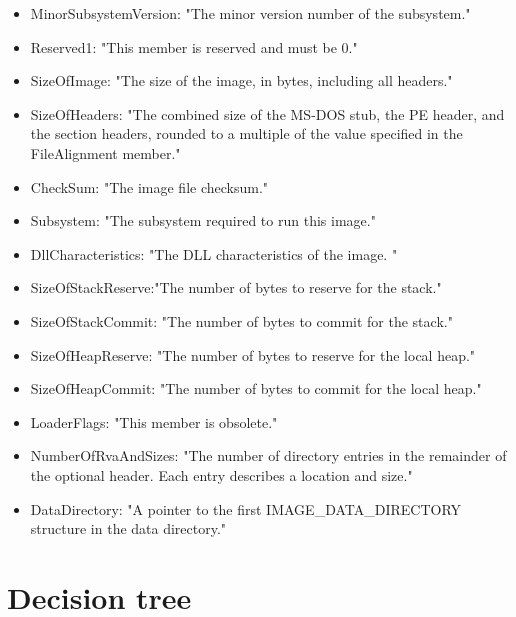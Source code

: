 \begin{itemize}
\item MinorSubsystemVersion: "The minor version number of the subsystem."
\item Reserved1: "This member is reserved and must be 0."
\item SizeOfImage: "The size of the image, in bytes, including all headers."
\item SizeOfHeaders: "The combined size of the MS-DOS stub, the PE header, and the section headers, rounded to a multiple of the value specified in the FileAlignment member."
\item CheckSum: "The image file checksum."
\item Subsystem: "The subsystem required to run this image."
\item DllCharacteristics: "The DLL characteristics of the image. "
\item SizeOfStackReserve:"The number of bytes to reserve for the stack."
\item SizeOfStackCommit: "The number of bytes to commit for the stack."
\item SizeOfHeapReserve: "The number of bytes to reserve for the local heap."
\item SizeOfHeapCommit: "The number of bytes to commit for the local heap."
\item LoaderFlags: "This member is obsolete."
\item NumberOfRvaAndSizes: "The number of directory entries in the remainder of the optional header. Each entry describes a location and size."
\item DataDirectory: "A pointer to the first IMAGE\_DATA\_DIRECTORY structure in the data directory."
\end{itemize}

\section{Decision tree\cite{decisiontree}}


